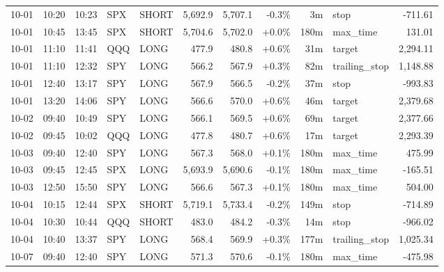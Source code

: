 \documentclass[11pt,a4paper,twoside]{article}
\begin{document}
\begin{center}
\begin{longtable}{>{\color{txtmain}}l l l l l r r r r >{\color{txtmain}}l r}
10-01 & 10:20 & 10:23 & SPX & SHORT & 5,692.9 & 5,707.1 & \textcolor{lossred}{-0.3\%} & 3m & stop & \textcolor{lossred}{-711.61} \\
10-01 & 10:45 & 13:45 & SPX & SHORT & 5,704.6 & 5,702.0 & \textcolor{wingreen}{+0.0\%} & 180m & max\_time & \textcolor{wingreen}{131.01} \\
10-01 & 11:10 & 11:41 & QQQ & LONG & 477.9 & 480.8 & \textcolor{wingreen}{+0.6\%} & 31m & target & \textcolor{wingreen}{2,294.11} \\
10-01 & 11:10 & 12:32 & SPY & LONG & 566.2 & 567.9 & \textcolor{wingreen}{+0.3\%} & 82m & trailing\_stop & \textcolor{wingreen}{1,148.88} \\
10-01 & 12:40 & 13:17 & SPY & LONG & 567.9 & 566.5 & \textcolor{lossred}{-0.2\%} & 37m & stop & \textcolor{lossred}{-993.83} \\
10-01 & 13:20 & 14:06 & SPY & LONG & 566.6 & 570.0 & \textcolor{wingreen}{+0.6\%} & 46m & target & \textcolor{wingreen}{2,379.68} \\
10-02 & 09:40 & 10:49 & SPY & LONG & 566.1 & 569.5 & \textcolor{wingreen}{+0.6\%} & 69m & target & \textcolor{wingreen}{2,377.66} \\
10-02 & 09:45 & 10:02 & QQQ & LONG & 477.8 & 480.7 & \textcolor{wingreen}{+0.6\%} & 17m & target & \textcolor{wingreen}{2,293.39} \\
10-03 & 09:40 & 12:40 & SPY & LONG & 567.3 & 568.0 & \textcolor{wingreen}{+0.1\%} & 180m & max\_time & \textcolor{wingreen}{475.99} \\
10-03 & 09:45 & 12:45 & SPX & LONG & 5,693.9 & 5,690.6 & \textcolor{lossred}{-0.1\%} & 180m & max\_time & \textcolor{lossred}{-165.51} \\
10-03 & 12:50 & 15:50 & SPY & LONG & 566.6 & 567.3 & \textcolor{wingreen}{+0.1\%} & 180m & max\_time & \textcolor{wingreen}{504.00} \\
10-04 & 10:15 & 12:44 & SPX & SHORT & 5,719.1 & 5,733.4 & \textcolor{lossred}{-0.2\%} & 149m & stop & \textcolor{lossred}{-714.89} \\
10-04 & 10:30 & 10:44 & QQQ & SHORT & 483.0 & 484.2 & \textcolor{lossred}{-0.3\%} & 14m & stop & \textcolor{lossred}{-966.02} \\
10-04 & 10:40 & 13:37 & SPY & LONG & 568.4 & 569.9 & \textcolor{wingreen}{+0.3\%} & 177m & trailing\_stop & \textcolor{wingreen}{1,025.34} \\
10-07 & 09:40 & 12:40 & SPY & LONG & 571.3 & 570.6 & \textcolor{lossred}{-0.1\%} & 180m & max\_time & \textcolor{lossred}{-475.98} \\

\end{longtable}
\end{center}
\end{document}
